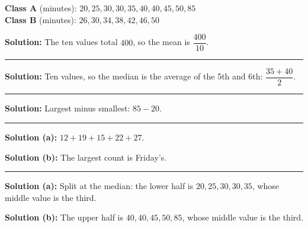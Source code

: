 \documentclass[12pt]{article}
\begin{document}



\noindent\textbf{Class A} (minutes): $20, 25, 30, 30, 35, 40, 40, 45, 50, 85$ \\
\textbf{Class B} (minutes): $26, 30, 34, 38, 42, 46, 50$


\textbf{Solution:} \quad The ten values total $400$, so the mean is $\dfrac{400}{10}$.

\vspace{0.15cm}\noindent\rule{\linewidth}{0.2pt}\vspace{0.15cm}


\textbf{Solution:} \quad Ten values, so the median is the average of the 5th and 6th:
$\dfrac{35 + 40}{2}$. 

\vspace{0.15cm}\noindent\rule{\linewidth}{0.2pt}\vspace{0.15cm}


\textbf{Solution:} \quad Largest minus smallest: $85 - 20$. 

\vspace{0.15cm}\noindent\rule{\linewidth}{0.2pt}\vspace{0.15cm}


\textbf{Solution (a):} \quad $12 + 19 + 15 + 22 + 27$. 

\textbf{Solution (b):} \quad The largest count is Friday's. 

\vspace{0.15cm}\noindent\rule{\linewidth}{0.2pt}\vspace{0.15cm}


\textbf{Solution (a):} \quad Split at the median: the lower half is $20, 25, 30, 30, 35$, whose
middle value is the third. 

\textbf{Solution (b):} \quad The upper half is $40, 40, 45, 50, 85$, whose middle value is the
third. 
\end{document}
